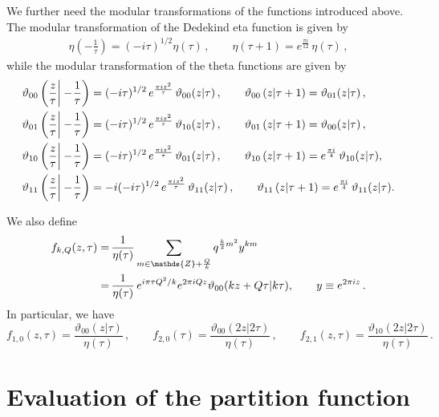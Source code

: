 \documentclass[12pt,a4paper]{article}
\newcommand{\be}{\begin{equation}}
\newcommand{\ee}{\end{equation}}
\newcommand{\IZ}{\mathds{Z}}
\newcommand{\I}{\mathrm{i}}
\def\({\left(}
\def\){\right)}
\newcommand{\vt}{\vartheta}
\def\I{i}
\begin{document}
We further need the modular transformations of the functions introduced above.
The modular transformation of the Dedekind eta function is given by
\begin{align} \label{modularEta}
\eta \( -\frac{1}{\tau}\)
=
(-\I \tau)^{1/2} \eta(\tau) \, ,
\qquad
\eta \( \tau+1 \)
=
e^{\frac{\pi\I}{12}}\, \eta(\tau) \, ,
\end{align}
while the modular transformation of the theta functions are given by
\begin{subequations} \label{modularTheta}
\begin{align}
&\vt_{00} \({z \over \tau} \bigg| -\!\frac{1}{\tau} \)
=
(-i \tau)^{1/2}\, e^{\frac{\pi \I z^2}{\tau}}\, \vt_{00} (z| \tau) \, ,
\qquad
\vt_{00} \(z | \tau + 1\) =  \vt_{01} (z| \tau) \, ,
\\
&\vt_{01} \({z \over \tau} \bigg| -\!\frac{1}{\tau} \)
=
(-i \tau)^{1/2}\, e^{\frac{\pi \I z^2}{\tau}}\, \vt_{10} (z| \tau) \, ,
\qquad
\vt_{01} \(z | \tau + 1 \)
=
\vt_{00} (z| \tau) \, ,
\\
&\vt_{10} \({z \over \tau} \bigg| -\!\frac{1}{\tau} \)
=
(-i \tau)^{1/2} \, e^{\frac{\pi \I z^2}{\tau}}\, \vt_{01} (z| \tau) \, ,
\qquad
\vt_{10} \(z | \tau + 1 \)
=
e^{\frac{ \pi \I }{4}}\,\vt_{10} (z| \tau) ,
\\
&\vt_{11} \({z \over \tau} \bigg|-\!\frac{1}{\tau} \)
=
-i(-i \tau)^{1/2} \, e^{\frac{\pi \I z^2}{\tau}}\, \vt_{11} (z| \tau) \, ,
\qquad
\vt_{11} \(z | \tau + 1 \)
=
e^{\frac{ \pi \I }{4}}\, \vt_{11} (z| \tau).
\end{align}
\end{subequations}

We also define
\be
\label{edeffkq}
\begin{split}
f_{k,Q} (z,\tau) = &\, {1\over \eta(\tau)} \sum_{m\in\IZ+\frac{Q}{k}} q^{{k\over 2} m^2}y^{km}
\\
=&\,  {1\over \eta(\tau)} \,  e^{i\pi\tau Q^2/k} e^{2\pi i Q z} \vt_{00}(kz + Q\tau|k\tau),
\qquad
y\equiv e^{2\pi i z}\, .
\end{split}
\ee
In particular, we have
\be
f_{1,0}(z,\tau)=\frac{\vt_{00}(z|\tau)}{\eta(\tau)}\, ,
\qquad
f_{2,0}(\tau) = \frac{\vt_{00}(2z|2\tau)}{\eta(\tau)}\, ,
\qquad
f_{2,1}(z,\tau)= \frac{\vt_{10}(2z|2\tau)}{\eta(\tau)}\, .
\label{evalf1}
\ee

\section{Evaluation of the partition function} \label{saE}
\end{document}
